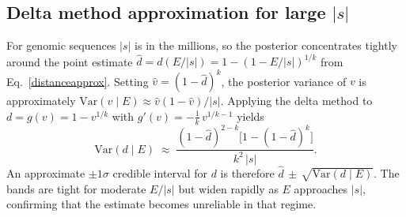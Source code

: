 \documentclass[pdflatex,sn-vancouver-num]{sn-jnl}
\begin{document}
\begin{appendices}
\subsection{Delta method approximation for large $|s|$}

For genomic sequences $|s|$ is in the millions, so the posterior concentrates tightly around the point estimate $\hat{d} = d(E/|s|) = 1-(1-E/|s|)^{1/k}$ from Eq.~\eqref{distanceapprox}. Setting $\hat{v} = (1-\hat{d})^k$, the posterior variance of $v$ is approximately $\mathrm{Var}(v\mid E)\approx \hat{v}(1-\hat{v})/|s|$. Applying the delta method to $d = g(v) = 1-v^{1/k}$ with $g'(v) = -\tfrac{1}{k}\,v^{1/k-1}$ yields
\begin{equation}
  \mathrm{Var}(d\mid E) \;\approx\;
  \frac{(1-\hat{d})^{2-k}\bigl[1-(1-\hat{d})^k\bigr]}{k^2\,|s|}.
  \label{eq:ddeltavar}
\end{equation}
An approximate $\pm 1\sigma$ credible interval for $d$ is therefore $\hat{d}\,\pm\,\sqrt{\mathrm{Var}(d\mid E)}$. The bands are tight for moderate $E/|s|$ but widen rapidly as $E$ approaches $|s|$, confirming that the estimate becomes unreliable in that regime.

\end{appendices}
\end{document}
